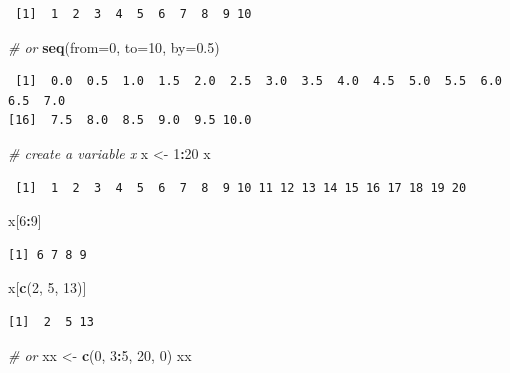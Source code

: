 \documentclass[
]{book}
\newenvironment{Shaded}{\begin{snugshade}}{\end{snugshade}}
\newcommand{\CommentTok}[1]{\textcolor[rgb]{0.56,0.35,0.01}{\textit{#1}}}
\newcommand{\DataTypeTok}[1]{\textcolor[rgb]{0.13,0.29,0.53}{#1}}
\newcommand{\DecValTok}[1]{\textcolor[rgb]{0.00,0.00,0.81}{#1}}
\newcommand{\FloatTok}[1]{\textcolor[rgb]{0.00,0.00,0.81}{#1}}
\newcommand{\KeywordTok}[1]{\textcolor[rgb]{0.13,0.29,0.53}{\textbf{#1}}}
\newcommand{\NormalTok}[1]{#1}
\newcommand{\OperatorTok}[1]{\textcolor[rgb]{0.81,0.36,0.00}{\textbf{#1}}}
\newcommand{\StringTok}[1]{\textcolor[rgb]{0.31,0.60,0.02}{#1}}
\begin{document}
\begin{verbatim}
 [1]  1  2  3  4  5  6  7  8  9 10
\end{verbatim}

\begin{Shaded}
\begin{Highlighting}[]
\CommentTok{# or}
\KeywordTok{seq}\NormalTok{(}\DataTypeTok{from=}\DecValTok{0}\NormalTok{, }\DataTypeTok{to=}\DecValTok{10}\NormalTok{, }\DataTypeTok{by=}\FloatTok{0.5}\NormalTok{)}
\end{Highlighting}
\end{Shaded}

\begin{verbatim}
 [1]  0.0  0.5  1.0  1.5  2.0  2.5  3.0  3.5  4.0  4.5  5.0  5.5  6.0  6.5  7.0
[16]  7.5  8.0  8.5  9.0  9.5 10.0
\end{verbatim}

\begin{Shaded}
\begin{Highlighting}[]
\CommentTok{# create a variable x}
\NormalTok{x <-}\StringTok{ }\DecValTok{1}\OperatorTok{:}\DecValTok{20}
\NormalTok{x}
\end{Highlighting}
\end{Shaded}

\begin{verbatim}
 [1]  1  2  3  4  5  6  7  8  9 10 11 12 13 14 15 16 17 18 19 20
\end{verbatim}

\begin{Shaded}
\begin{Highlighting}[]
\NormalTok{x[}\DecValTok{6}\OperatorTok{:}\DecValTok{9}\NormalTok{]}
\end{Highlighting}
\end{Shaded}

\begin{verbatim}
[1] 6 7 8 9
\end{verbatim}

\begin{Shaded}
\begin{Highlighting}[]
\NormalTok{x[}\KeywordTok{c}\NormalTok{(}\DecValTok{2}\NormalTok{, }\DecValTok{5}\NormalTok{, }\DecValTok{13}\NormalTok{)]}
\end{Highlighting}
\end{Shaded}

\begin{verbatim}
[1]  2  5 13
\end{verbatim}

\begin{Shaded}
\begin{Highlighting}[]
\CommentTok{# or}
\NormalTok{xx <-}\StringTok{ }\KeywordTok{c}\NormalTok{(}\DecValTok{0}\NormalTok{, }\DecValTok{3}\OperatorTok{:}\DecValTok{5}\NormalTok{, }\DecValTok{20}\NormalTok{, }\DecValTok{0}\NormalTok{)}
\NormalTok{xx}
\end{Highlighting}
\end{Shaded}
\end{document}
